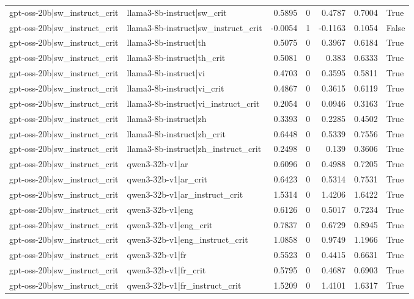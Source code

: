 \begin{table}
\begin{tabular}{l l r r r r l}
gpt-oss-20b|sw_instruct_crit & llama3-8b-instruct|sw_crit & 0.5895 & 0 & 0.4787 & 0.7004 & True \\
gpt-oss-20b|sw_instruct_crit & llama3-8b-instruct|sw_instruct_crit & -0.0054 & 1 & -0.1163 & 0.1054 & False \\
gpt-oss-20b|sw_instruct_crit & llama3-8b-instruct|th & 0.5075 & 0 & 0.3967 & 0.6184 & True \\
gpt-oss-20b|sw_instruct_crit & llama3-8b-instruct|th_crit & 0.5081 & 0 & 0.383 & 0.6333 & True \\
gpt-oss-20b|sw_instruct_crit & llama3-8b-instruct|vi & 0.4703 & 0 & 0.3595 & 0.5811 & True \\
gpt-oss-20b|sw_instruct_crit & llama3-8b-instruct|vi_crit & 0.4867 & 0 & 0.3615 & 0.6119 & True \\
gpt-oss-20b|sw_instruct_crit & llama3-8b-instruct|vi_instruct_crit & 0.2054 & 0 & 0.0946 & 0.3163 & True \\
gpt-oss-20b|sw_instruct_crit & llama3-8b-instruct|zh & 0.3393 & 0 & 0.2285 & 0.4502 & True \\
gpt-oss-20b|sw_instruct_crit & llama3-8b-instruct|zh_crit & 0.6448 & 0 & 0.5339 & 0.7556 & True \\
gpt-oss-20b|sw_instruct_crit & llama3-8b-instruct|zh_instruct_crit & 0.2498 & 0 & 0.139 & 0.3606 & True \\
gpt-oss-20b|sw_instruct_crit & qwen3-32b-v1|ar & 0.6096 & 0 & 0.4988 & 0.7205 & True \\
gpt-oss-20b|sw_instruct_crit & qwen3-32b-v1|ar_crit & 0.6423 & 0 & 0.5314 & 0.7531 & True \\
gpt-oss-20b|sw_instruct_crit & qwen3-32b-v1|ar_instruct_crit & 1.5314 & 0 & 1.4206 & 1.6422 & True \\
gpt-oss-20b|sw_instruct_crit & qwen3-32b-v1|eng & 0.6126 & 0 & 0.5017 & 0.7234 & True \\
gpt-oss-20b|sw_instruct_crit & qwen3-32b-v1|eng_crit & 0.7837 & 0 & 0.6729 & 0.8945 & True \\
gpt-oss-20b|sw_instruct_crit & qwen3-32b-v1|eng_instruct_crit & 1.0858 & 0 & 0.9749 & 1.1966 & True \\
gpt-oss-20b|sw_instruct_crit & qwen3-32b-v1|fr & 0.5523 & 0 & 0.4415 & 0.6631 & True \\
gpt-oss-20b|sw_instruct_crit & qwen3-32b-v1|fr_crit & 0.5795 & 0 & 0.4687 & 0.6903 & True \\
gpt-oss-20b|sw_instruct_crit & qwen3-32b-v1|fr_instruct_crit & 1.5209 & 0 & 1.4101 & 1.6317 & True \\

\end{tabular}
\end{table}
